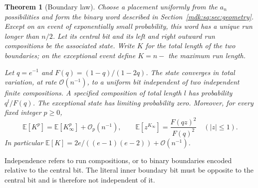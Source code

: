 \documentclass[11pt,letterpaper]{article}
\numberwithin{equation}{section}
\newtheorem{theorem}{Theorem}[section]
\theoremstyle{remark}\newtheorem{remark}[theorem]{Remark}
\newcommand{\Oh}{\mathcal O}\newcommand{\Q}{\mathbb Q}\newcommand{\N}{\mathbb N}\newcommand{\R}{\mathbb R}
\begin{document}
\begin{theorem}[Boundary law]\label{mdk:sq:thm:law}
Choose a placement uniformly from the $a_n$ possibilities and form the binary word described in Section~\ref{mdk:sq:sec:geometry}. Except on an event of exponentially small probability, this word has a unique run longer than $n/2$. Let its central bit and its left and right outward run compositions be the associated state. Write $K$ for the total length of the two boundaries; on the exceptional event define $K=n-$ the maximum run length.

Let $q=e^{-1}$ and $F(q)=(1-q)/(1-2q)$. The state converges in total variation, at rate $\Oh(n^{-1})$, to a uniform bit independent of two independent finite compositions. A specified composition of total length $l$ has probability $q^l/F(q)$. The exceptional state has limiting probability zero. Moreover, for every fixed integer $p\ge0$,
\begin{equation}\label{mdk:sq:eq:moments}
\mathbb E[K^p]=\mathbb E[K_\infty^p]+\Oh_p(n^{-1}),\qquad
\mathbb E[z^{K_\infty}]=\frac{F(qz)^2}{F(q)^2}\quad(|z|\le1).
\end{equation}
In particular $\mathbb E[K]=2e/((e-1)(e-2))+\Oh(n^{-1})$.
\end{theorem}
Independence refers to run compositions, or to binary boundaries encoded relative to the central bit. The literal inner boundary bit must be opposite to the central bit and is therefore not independent of it.
\end{document}
